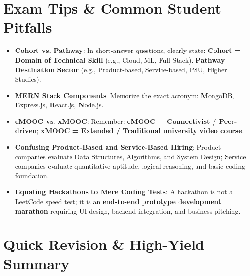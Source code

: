 \section{Exam Tips \& Common Student Pitfalls}

\begin{examtip}
\begin{itemize}
    \item \textbf{Cohort vs. Pathway}: In short-answer questions, clearly state: \textbf{Cohort = Domain of Technical Skill} (e.g., Cloud, ML, Full Stack). \textbf{Pathway = Destination Sector} (e.g., Product-based, Service-based, PSU, Higher Studies).
    \item \textbf{MERN Stack Components}: Memorize the exact acronym: \textbf{M}ongoDB, \textbf{E}xpress.js, \textbf{R}eact.js, \textbf{N}ode.js.
    \item \textbf{cMOOC vs. xMOOC}: Remember: \textbf{cMOOC = Connectivist / Peer-driven}; \textbf{xMOOC = Extended / Traditional university video course}.
\end{itemize}
\end{examtip}

\begin{commonmistake}
\begin{itemize}
    \item \textbf{Confusing Product-Based and Service-Based Hiring}: Product companies evaluate Data Structures, Algorithms, and System Design; Service companies evaluate quantitative aptitude, logical reasoning, and basic coding foundation.
    \item \textbf{Equating Hackathons to Mere Coding Tests}: A hackathon is not a LeetCode speed test; it is an \textbf{end-to-end prototype development marathon} requiring UI design, backend integration, and business pitching.
\end{itemize}
\end{commonmistake}

\section{Quick Revision \& High-Yield Summary}

